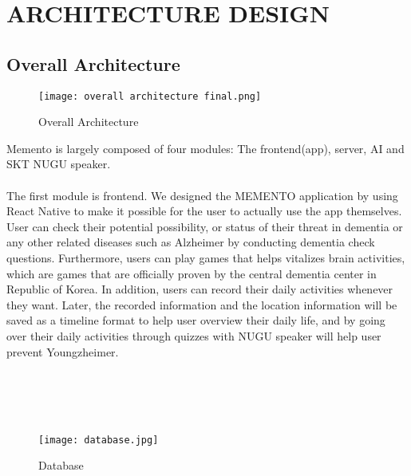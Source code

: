 \documentclass[conference]{IEEEtran}
\begin{document}
\section{ARCHITECTURE DESIGN}
\subsection{Overall Architecture}

\begin{figure}[h]
\centerline{\texttt{[image: overall architecture final.png]}}
\caption{Overall Architecture}
\label{fig}
\end{figure}

Memento is largely composed of four modules: The frontend(app), server, AI and SKT NUGU speaker.\\\\
\indent The first module is frontend. We designed the MEMENTO application by using React Native to make it possible for the user to actually use the app themselves. User can check their potential possibility, or status of their threat in dementia or any other related diseases such as Alzheimer by conducting dementia check questions. Furthermore, users can play games that helps vitalizes brain activities, which are games that are officially proven by the central dementia center in Republic of Korea. In addition, users can record their daily activities whenever they want. Later, the recorded information and the location information will be saved as a timeline format to help user overview their daily life, and by going over their daily activities through quizzes with NUGU speaker will help user prevent Youngzheimer.\\
\\\\\\\\
\begin{figure}[h]
\centerline{\texttt{[image: database.jpg]}}
\caption{Database}
\label{fig}
\end{figure}
\\
\end{document}
